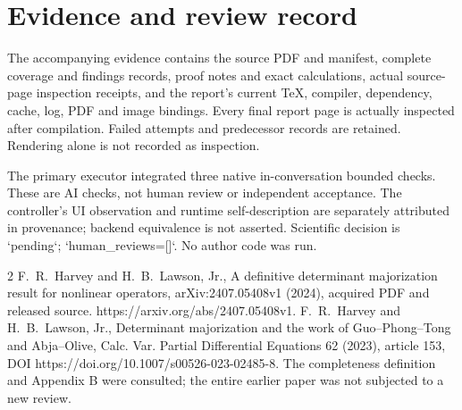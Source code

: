 \documentclass[10pt]{article}
\begin{document}
\section*{Evidence and review record}
The accompanying evidence contains the source PDF and manifest, complete coverage and findings records, proof notes and exact calculations, actual source-page inspection receipts, and the report’s current TeX, compiler, dependency, cache, log, PDF and image bindings. Every final report page is actually inspected after compilation. Failed attempts and predecessor records are retained. Rendering alone is not recorded as inspection.\par
The primary executor integrated three native in-conversation bounded checks. These are AI checks, not human review or independent acceptance. The controller’s UI observation and runtime self-description are separately attributed in provenance; backend equivalence is not asserted. Scientific decision is `pending`; `human\_reviews=[]`. No author code was run.\par
2 F. R. Harvey and H. B. Lawson, Jr., A definitive determinant majorization result for nonlinear operators, arXiv:2407.05408v1 (2024), acquired PDF and released source. https://arxiv.org/abs/2407.05408v1. F. R. Harvey and H. B. Lawson, Jr., Determinant majorization and the work of Guo–Phong–Tong and Abja–Olive, Calc. Var. Partial Differential Equations 62 (2023), article 153, DOI https://doi.org/10.1007/s00526-023-02485-8. The completeness definition and Appendix B were consulted; the entire earlier paper was not subjected to a new review.\par
\end{document}
